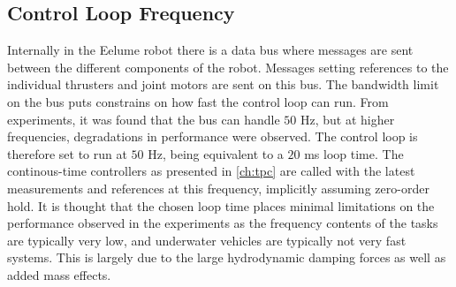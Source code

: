 \subsection*{Control Loop Frequency}
Internally in the Eelume robot there is a data bus where messages are sent
between the different components of the robot. Messages setting references
to the individual thrusters and joint motors are sent on this bus. The bandwidth
limit on the bus puts constrains on how fast the control loop can run. From
experiments, it was found that the bus can handle \(50\) Hz, but at higher
frequencies, degradations in performance were observed. The control loop is
therefore set to run at \(50\) Hz, being equivalent to a \(20\) ms loop time.
The continous-time controllers as presented in \autoref{ch:tpc} are called with
the latest measurements and references at this frequency, implicitly assuming
zero-order hold.
It is thought that the chosen loop time places minimal limitations on the performance
observed in the experiments as the frequency contents of the tasks are typically
very low, and underwater vehicles are typically not very fast systems. This is
largely due to the large hydrodynamic damping forces as well as added mass effects.


